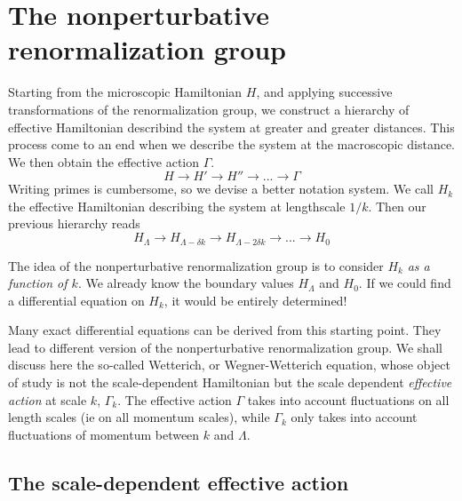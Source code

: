 \section{The nonperturbative renormalization group}

Starting from the microscopic Hamiltonian $H$, and applying successive transformations of the renormalization group, we construct a hierarchy of effective Hamiltonian describind the system at greater and greater distances. This process come to an end when we describe the system at the macroscopic distance. We then obtain the effective action $\Gamma$.
\begin{equation}
H \rightarrow H' \rightarrow H'' \rightarrow ... \rightarrow \Gamma
\end{equation}
Writing primes is cumbersome, so we devise a better notation system. We call $H_k$ the effective Hamiltonian describing the system at lengthscale $1/k$. Then our previous hierarchy reads
\begin{equation}
H_\Lambda \rightarrow H_{\Lambda - \delta k} \rightarrow H_{\Lambda - 2 \delta k} \rightarrow ... \rightarrow H_0
\end{equation}

The idea of the nonperturbative renormalization group is to consider $H_k$ \textit{as a function of $k$}. We already know the boundary values $H_\Lambda$ and $H_0$. If we could find a differential equation on $H_k$, it would be entirely determined!

Many exact differential equations can be derived from this starting point. They lead to different version of the nonperturbative renormalization group. We shall discuss here the so-called Wetterich, or Wegner-Wetterich equation, whose object of study is not the scale-dependent Hamiltonian but the scale dependent \textit{effective action} at scale $k$,  $\Gamma_k$. The effective action $\Gamma$ takes into account fluctuations on all length scales (ie on all momentum scales), while $\Gamma_k$ only takes into account fluctuations of momentum between $k$ and $\Lambda$.

\subsection{The scale-dependent effective action}

